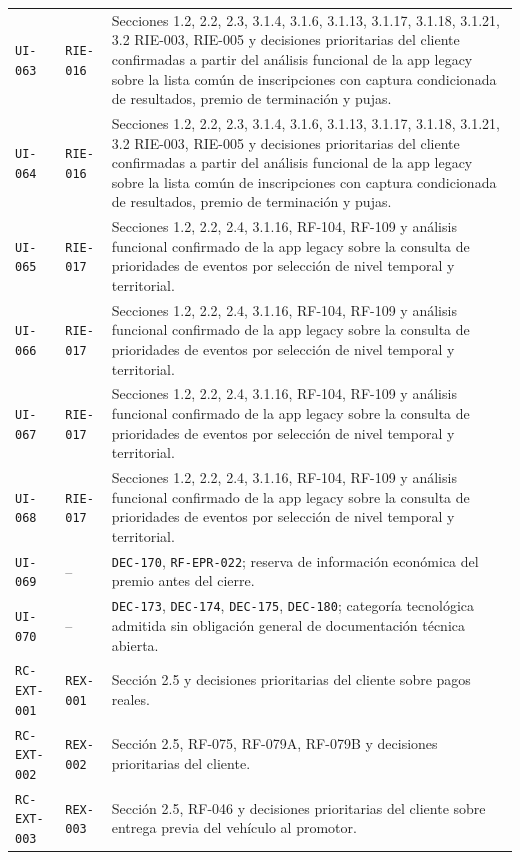 \documentclass[10pt,letterpaper]{article}
\begin{document}
\begin{landscape}
\begin{longtable}{P{2.7cm}P{2.6cm}P{15.7cm}}
\texttt{UI-063} & \texttt{RIE-016} & Secciones 1.2, 2.2, 2.3, 3.1.4, 3.1.6, 3.1.13, 3.1.17, 3.1.18, 3.1.21, 3.2 RIE-003, RIE-005 y decisiones prioritarias del cliente confirmadas a partir del análisis funcional de la app legacy sobre la lista común de inscripciones con captura condicionada de resultados, premio de terminación y pujas.\\
\texttt{UI-064} & \texttt{RIE-016} & Secciones 1.2, 2.2, 2.3, 3.1.4, 3.1.6, 3.1.13, 3.1.17, 3.1.18, 3.1.21, 3.2 RIE-003, RIE-005 y decisiones prioritarias del cliente confirmadas a partir del análisis funcional de la app legacy sobre la lista común de inscripciones con captura condicionada de resultados, premio de terminación y pujas.\\
\texttt{UI-065} & \texttt{RIE-017} & Secciones 1.2, 2.2, 2.4, 3.1.16, RF-104, RF-109 y análisis funcional confirmado de la app legacy sobre la consulta de prioridades de eventos por selección de nivel temporal y territorial.\\
\texttt{UI-066} & \texttt{RIE-017} & Secciones 1.2, 2.2, 2.4, 3.1.16, RF-104, RF-109 y análisis funcional confirmado de la app legacy sobre la consulta de prioridades de eventos por selección de nivel temporal y territorial.\\
\texttt{UI-067} & \texttt{RIE-017} & Secciones 1.2, 2.2, 2.4, 3.1.16, RF-104, RF-109 y análisis funcional confirmado de la app legacy sobre la consulta de prioridades de eventos por selección de nivel temporal y territorial.\\
\texttt{UI-068} & \texttt{RIE-017} & Secciones 1.2, 2.2, 2.4, 3.1.16, RF-104, RF-109 y análisis funcional confirmado de la app legacy sobre la consulta de prioridades de eventos por selección de nivel temporal y territorial.\\
\texttt{UI-069} & -- & \texttt{DEC-170}, \texttt{RF-EPR-022}; reserva de información económica del premio antes del cierre.\\
\texttt{UI-070} & -- & \texttt{DEC-173}, \texttt{DEC-174}, \texttt{DEC-175}, \texttt{DEC-180}; categoría tecnológica admitida sin obligación general de documentación técnica abierta.\\
\texttt{RC-EXT-001} & \texttt{REX-001} & Sección 2.5 y decisiones prioritarias del cliente sobre pagos reales.\\
\texttt{RC-EXT-002} & \texttt{REX-002} & Sección 2.5, RF-075, RF-079A, RF-079B y decisiones prioritarias del cliente.\\
\texttt{RC-EXT-003} & \texttt{REX-003} & Sección 2.5, RF-046 y decisiones prioritarias del cliente sobre entrega previa del vehículo al promotor.\\

\end{longtable}
\end{landscape}
\end{document}
